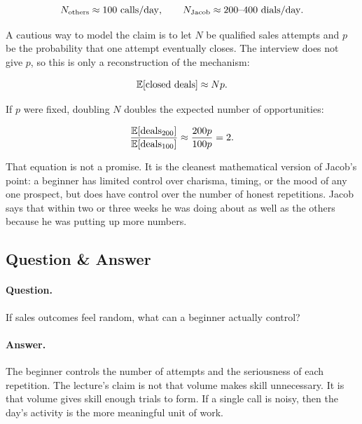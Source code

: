 \begin{equation}
N_{\mathrm{others}} \approx 100 \ \mathrm{calls/day},
\qquad
N_{\mathrm{Jacob}} \approx 200\hbox{--}400 \ \mathrm{dials/day}.
\end{equation}

A cautious way to model the claim is to let \(N\) be qualified sales attempts and \(p\) be the probability that one attempt eventually closes. The interview does not give \(p\), so this is only a reconstruction of the mechanism:

\begin{equation}
\mathbb{E}[\hbox{closed deals}] \approx Np.
\end{equation}

If \(p\) were fixed, doubling \(N\) doubles the expected number of opportunities:

\begin{equation}
\frac{\mathbb{E}[\hbox{deals}_{200}]}{\mathbb{E}[\hbox{deals}_{100}]}
\approx
\frac{200p}{100p}
=
2.
\end{equation}

That equation is not a promise. It is the cleanest mathematical version of Jacob's point: a beginner has limited control over charisma, timing, or the mood of any one prospect, but does have control over the number of honest repetitions. Jacob says that within two or three weeks he was doing about as well as the others because he was putting up more numbers.

\subsection{Question \& Answer}

\paragraph{Question.}
If sales outcomes feel random, what can a beginner actually control?

\paragraph{Answer.}
The beginner controls the number of attempts and the seriousness of each repetition. The lecture's claim is not that volume makes skill unnecessary. It is that volume gives skill enough trials to form. If a single call is noisy, then the day's activity is the more meaningful unit of work.

